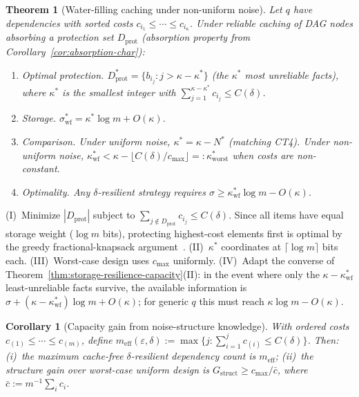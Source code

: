 \documentclass[journal]{IEEEtran}
\makeatletter
\newtheorem{theorem}{Theorem}[section]
\newtheorem{corollary}{Corollary}[section]
\numberwithin{equation}{section}
\renewenvironment{proof}[1][\proofname]{\par
  \pushQED{\qed}%
  \normalfont \topsep6\p@\@plus6\p@\relax
  \trivlist
  \item[\hskip\labelsep
        \itshape
    #1\@addpunct{.}]\ignorespaces
}{%
  \popQED\endtrivlist\@endpefalse
}
\makeatother
\begin{document}
\begin{theorem}[Water-filling caching under non-uniform noise]
\label{thm:water-filling}
Let $q$ have dependencies with sorted costs
$c_{i_1}\le\cdots\le c_{i_\kappa}$.
Under reliable caching of DAG nodes absorbing a protection set
$D_{\mathrm{prot}}$
\textup{(}absorption property from
Corollary~\textup{\ref{cor:absorption-char})}:

\begin{enumerate}[label=\textup{(\Roman*)}]
\item \emph{Optimal protection.}
$D_{\mathrm{prot}}^*=\{b_{i_j}:j>\kappa{-}\kappa^*\}$
(the $\kappa^*$ most unreliable facts), where $\kappa^*$ is
the smallest integer with
$\sum_{j=1}^{\kappa-\kappa^*}c_{i_j}\le C(\delta)$.

\item \emph{Storage.}
$\sigma^*_{\mathrm{wf}}=\kappa^*\log m+O(\kappa)$.

\item \emph{Comparison.}
Under uniform noise, $\kappa^*=\kappa-N^*$
(matching CT4).
Under non-uniform noise,
$\kappa^*_{\mathrm{wf}}
 <\kappa-\lfloor C(\delta)/c_{\max}\rfloor
 =:\kappa^*_{\mathrm{worst}}$
when costs are non-constant.

\item \emph{Optimality.}
Any $\delta$-resilient strategy requires
$\sigma\ge\kappa^*_{\mathrm{wf}}\log m-O(\kappa)$.
\end{enumerate}
\end{theorem}

\begin{proof}
(I)~Minimize $|D_{\mathrm{prot}}|$ subject to
$\sum_{j\notin D_{\mathrm{prot}}}c_{i_j}\le C(\delta)$.
Since all items have equal storage weight ($\log m$ bits),
protecting highest-cost elements first is optimal by the
greedy fractional-knapsack
argument~\cite{cormen2022introduction}.
(II)~$\kappa^*$ coordinates at $\lceil\log m\rceil$ bits each.
(III)~Worst-case design uses $c_{\max}$ uniformly.
(IV)~Adapt the converse of
Theorem~\ref{thm:storage-resilience-capacity}(II):
in the event where only the $\kappa{-}\kappa^*_{\mathrm{wf}}$
least-unreliable facts survive, the available information is
$\sigma+(\kappa{-}\kappa^*_{\mathrm{wf}})\log m+O(\kappa)$;
for generic $q$ this must reach $\kappa\log m-O(\kappa)$.
\end{proof}

\begin{corollary}[Capacity gain from noise-structure knowledge]
\label{cor:noise-structure-gain}
With ordered costs $c_{(1)}\le\cdots\le c_{(m)}$, define
$m_{\mathrm{eff}}(\varepsilon,\delta)
 :=\max\{j:\sum_{i=1}^j c_{(i)}\le C(\delta)\}$.
Then:
\textup{(i)}~the maximum cache-free $\delta$-resilient
dependency count is $m_{\mathrm{eff}}$;
\textup{(ii)}~the structure gain over worst-case uniform design
is $G_{\mathrm{struct}}\ge c_{\max}/\bar c$, where
$\bar c:=m^{-1}\sum_i c_i$.
\end{corollary}
\end{document}
